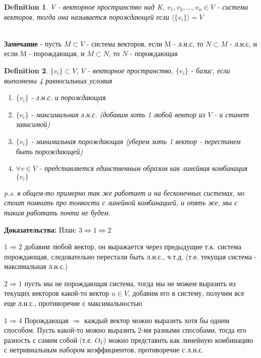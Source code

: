 \documentclass[12pt]{article}
\newtheorem{definition}{Definition}
\begin{document}
\begin{definition}
    V - векторное пространство над K, $v_1, v_2, ..., v_n \in V$ - система векторов, тогда она называется порождающей если $\langle\{v_i\} \rangle =V$
\end{definition} 
\\

\textbf{Замечание} - пусть $M \subset V$ - система векторов, если M - л.н.с, то $N \subset M$ - л.н.с, и если M - порождающая, и $M \subset N$, то $N$ - порождающая
\\

\begin{definition}
    $\{v_i\} \subset V$, $V$ - векторное пространство, $\{v_i\}$ - базис, если выполнены 4 равносильных условия
    \begin{enumerate}
        \item $\{v_i\}$ - л.н.с. и порождающая
        \item $\{v_i\}$ - максимальная л.н.с. (добавим хоть 1 любой вектор из $V$ - и станет зависимой)
        \item $\{v_i\}$ - минимальная порождающая (уберем хоть 1 вектор - перестанем быть порождающей)
        \item $\forall v \in V$ - представляется единственным образом как линейная комбинация $\{v_i\}$ 
    \end{enumerate}
    p.s. в общем-то примерно так же работает и на бесконечных системах, но стоит помнить про тонкости с линейной комбинацией, и опять же, мы с таким работать почти не будем.

\end{definition} 

\textbf{Доказательства:} План: $3 \Leftrightarrow 1 \Leftrightarrow 2$ 

$1 \Rightarrow 2$ добавим любой вектор, он выражается через предыдущие т.к. система порождающая, следовательно перестали быть л.н.с., ч.т.д. (т.е. текущая система - максимальная л.н.с.)

$2 \Rightarrow 1$ пусть мы не порождающая система, тогда мы не можем выразить из текущих векторов какой-то вектор $u \in V$, добавим его в систему, получим все еще л.н.с., противоречие с максимальностью

$1 \Rightarrow 4$ Порождающая $\Rightarrow$ каждый вектор можно выразить хотя бы одним способом. Пусть какой-то можно выразить 2-мя разными способами, тогда его разность с самим собой (т.е. $O_V$) можно представить как линейную комбинацию с нетривиальным набором коэффициентов, противоречие с л.н.с.
\end{document}
